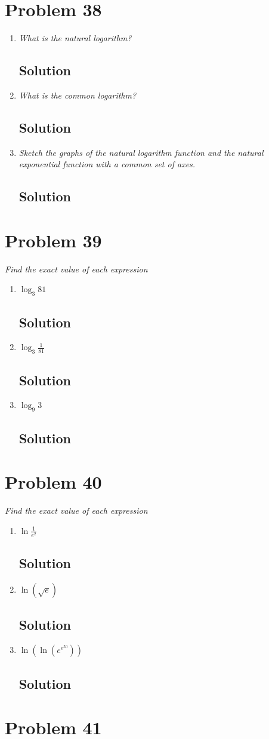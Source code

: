 \documentclass[11pt]{article}
\newcommand{\soln}{\subsection*}
\newcommand{\qn}{\textit}
\begin{document}
\section*{Problem 38}

\begin{enumerate}
	\item \qn{What is the natural logarithm?}
	\soln{Solution}
	
	\item \qn{What is the common logarithm?}
	\soln{Solution}
	
	\item \qn{Sketch the graphs of the natural logarithm function and the natural exponential function with a common set of axes.}
	\soln{Solution}
\end{enumerate}

\section*{Problem 39}

\qn{Find the exact value of each expression}
\begin{enumerate}
	\item \qn{$\log_3{81}$}
	\soln{Solution}
	
	\item \qn{$\log_3{\frac{1}{81}}$}
	\soln{Solution}
	
	\item \qn{$\log_9{3}$}
	\soln{Solution}
\end{enumerate}

\section*{Problem 40}

\qn{Find the exact value of each expression}
\begin{enumerate}
	\item \qn{$\ln{\frac{1}{e^2}}$}
	\soln{Solution}
	
	\item \qn{$\ln(\sqrt{e})$}
	\soln{Solution}
	
	\item \qn{$\ln(\ln(e^{e^{50}}))$}
	\soln{Solution}
\end{enumerate}

\section*{Problem 41}
\end{document}
